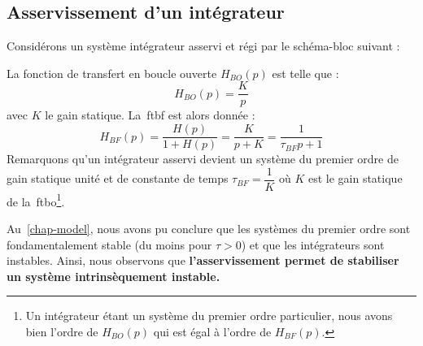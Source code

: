 \subsection{Asservissement d'un intégrateur}
Considérons un système intégrateur asservi et régi par le schéma-bloc suivant :
\begin{center}
    
\end{center}
La fonction de transfert en boucle ouverte $H_{BO}(p)$ est telle que :
\[
H_{BO}(p)=\dfrac{K}{p}
\]
avec $K$ le gain statique. 
La~\gls{ftbf} est alors donnée :
\[
H_{BF}(p)=\dfrac{H(p)}{1+H(p)}=\dfrac{K}{p+K}=\dfrac{1}{\tau_{BF} p+1}
\]
Remarquons qu'un intégrateur asservi devient un système du premier 
ordre de gain statique unité et de constante de temps $\tau_{BF}=\dfrac{1}{K}$ 
où $K$ est le gain statique de la~\gls{ftbo}\footnote{Un intégrateur étant 
un système du premier ordre particulier, nous avons bien l'ordre de $H_{BO}(p)$ 
qui est égal à l'ordre de $H_{BF}(p)$.}. 

Au~\cref{chap-model}, nous avons pu conclure que les systèmes du premier ordre 
sont fondamentalement stable (du moins pour $\tau>0$) et que les intégrateurs 
sont instables.
Ainsi, nous observons que \textbf{l'asservissement permet de stabiliser un 
système intrinsèquement instable.} 
